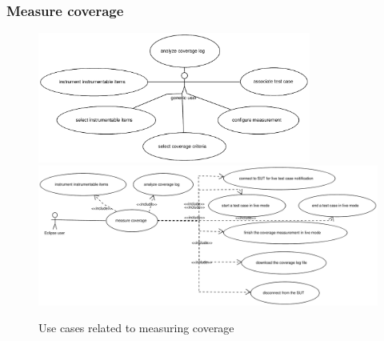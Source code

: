 \subsubsection{Measure coverage} \label{fr:Measure coverage}
\begin{figure}[htp]
 \centering
 \includegraphics[width=0.8\textwidth]{images/Use_Case_Models/measurecoverage}
 \newline
 \includegraphics[width=1.0\textwidth]{images/Use_Case_Models/measurecoverageEclipse}
 \caption{Use cases related to measuring coverage}
 \label{fr_fg:Use cases related to measuring coverage}
\end{figure}

